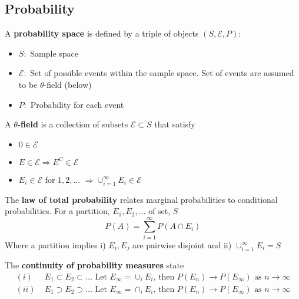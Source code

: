 \documentclass{article}
\begin{document}
\subsection{Probability}
A \textbf{probability space} is defined by a triple of objects $(S, \mathcal{E}, P)$:
\begin{itemize}
    \item $S:$ Sample space
    \item $\mathcal{E}:$ Set of possible events within the sample space. Set of events are assumed to be $\theta$-field (below)
    \item $P:$ Probability for each event
\end{itemize}
A \textbf{$\theta$-field} is a collection of subsets $\mathcal{E} \subset S$ that satisfy
\begin{itemize}
    \item $0 \in \mathcal{E}$
    \item $E \in \mathcal{E} \Rightarrow E^C \in \mathcal{E}$
    \item $E_i \in \mathcal{E}$ for {$1, 2, \dots$} $\Rightarrow \cup_{i=1}^\infty E_i \in \mathcal{E}$
\end{itemize}
The \textbf{law of total probability} relates marginal probabilities to conditional probabilities. For a partition, {$E_1, E_2, \dots$} of set, $S$
\begin{equation*}
     P(A) = \sum_{i=1}^\infty P(A\cap E_i)
\end{equation*}
Where a partition implies i) $E_i, E_j$ are pairwise disjoint and ii) $\cup_{i=1}^\infty E_i = S$

\noindent The \textbf{continuity of probability measures} state
\begin{align*}
    (i) \;& E_1 \subset E_2 \subset \dots \textrm{   Let } E_\infty = \cup_i E_i \textrm{, then } P(E_n) \longrightarrow P(E_\infty) \textrm{ as } n \longrightarrow \infty\\
    (ii) \;& E_1 \supset E_2 \supset \dots \textrm{   Let } E_\infty = \cap_i E_i \textrm{, then } P(E_n) \longrightarrow P(E_\infty) \textrm{ as } n \longrightarrow \infty\\\\
\end{align*}
\end{document}
